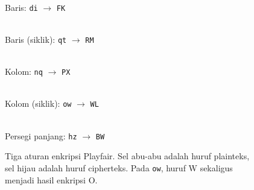 \begin{figure}[htbp]
  \centering
  \begin{minipage}{0.3\textwidth}
    \centering
    \\[3pt]
    \small Baris: \texttt{di} $\rightarrow$ \texttt{FK}
  \end{minipage}\hfill
  \begin{minipage}{0.3\textwidth}
    \centering
    \\[3pt]
    \small Baris (siklik): \texttt{qt} $\rightarrow$ \texttt{RM}
  \end{minipage}\hfill
  \begin{minipage}{0.3\textwidth}
    \centering
    \\[3pt]
    \small Kolom: \texttt{nq} $\rightarrow$ \texttt{PX}
  \end{minipage}

  \vspace{1em}
  \begin{minipage}{0.3\textwidth}
    \centering
    \\[3pt]
    \small Kolom (siklik): \texttt{ow} $\rightarrow$ \texttt{WL}
  \end{minipage}\hspace{0.04\textwidth}
  \begin{minipage}{0.3\textwidth}
    \centering
    \\[3pt]
    \small Persegi panjang: \texttt{hz} $\rightarrow$ \texttt{BW}
  \end{minipage}
  \caption{Tiga aturan enkripsi Playfair. Sel abu-abu adalah huruf plainteks, sel hijau adalah huruf cipherteks. Pada \texttt{ow}, huruf W sekaligus menjadi hasil enkripsi O.}
  \label{fig:playfair-aturan}
\end{figure}

